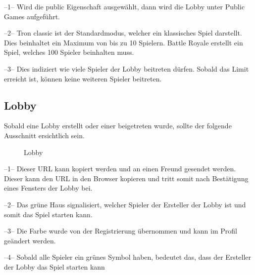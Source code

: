 \documentclass[11pt,ngerman]{article}
\begin{document}
    --1-- Wird die public Eigenschaft ausgewählt, dann wird die Lobby unter Public Games aufgeführt. 
    
    --2-- Tron classic ist der Standardmodus, welcher ein klassisches Spiel darstellt. Dies beinhaltet ein Maximum von bis zu 10 Spielern. Battle Royale erstellt ein Spiel, welches 100 Spieler beinhalten muss.
    
    --3-- Dies indiziert wie viele Spieler der Lobby beitreten dürfen. Sobald das Limit erreicht ist, können keine weiteren Spieler beitreten.
    
	\subsection{Lobby}
	
	Sobald eine Lobby erstellt oder einer beigetreten wurde, sollte der folgende Ausschnitt ersichtlich sein.
    \begin{figure}[H]
    	\centering
    	\caption{Lobby}
    	\label{fig:Lobby}
    \end{figure}
  
    
    --1-- Dieser URL kann kopiert werden und an einen Freund gesendet werden. Dieser kann den URL in den Browser kopieren und tritt somit nach Bestätigung eines Fensters der Lobby bei.
    
    --2-- Das grüne Haus signalisiert, welcher Spieler der Ersteller der Lobby ist und somit das Spiel starten kann.
    
    --3-- Die Farbe wurde von der Registrierung übernommen und kann im Profil geändert werden.
    
    --4-- Sobald alle Spieler ein grünes Symbol haben, bedeutet das, dass der Ersteller der Lobby das Spiel starten kann
    
\end{document}
